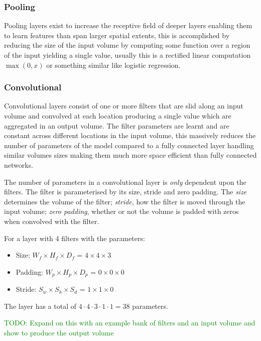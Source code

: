 \documentclass[A4paper,draft]{scrreprt}
\providecommand{\tightlist}{%
  \setlength{\itemsep}{0pt}\setlength{\parskip}{0pt}}
\begin{document}
\subsubsection{Pooling}\label{pooling}

Pooling layers exist to increase the receptive field of deeper layers
enabling them to learn features than span larger spatial extents, this
is accomplished by reducing the size of the input volume by computing
some function over a region of the input yielding a single value,
usually this is a rectified linear computation \(\max(0, x)\) or
something similar like logistic regression.

\subsubsection{Convolutional}\label{convolutional}

Convolutional layers consist of one or more filters that are slid along
an input volume and convolved at each location producing a single value
which are aggregated in an output volume. The filter parameters are
learnt and are constant across different locations in the input volume,
this massively reduces the number of parameters of the model compared to
a fully connected layer handling similar volumes sizes making them much
more space efficient than fully connected networks.

The number of parameters in a convolutional layer is \emph{only}
dependent upon the filters. The filter is parameterised by its size,
stride and zero padding. The \emph{size} determines the volume of the
filter; \emph{stride}, how the filter is moved through the input volume;
\emph{zero padding}, whether or not the volume is padded with zeros when
convolved with the filter.

For a layer with 4 filters with the parameters:

\begin{itemize}
\tightlist
\item
  Size: \(W_f \times H_f \times D_f\) = \(4 \times 4 \times 3\)
\item
  Padding: \(W_p \times H_p \times D_p\) = \(0 \times 0 \times 0\)
\item
  Stride: \(S_w \times S_h \times S_d\) = \(1 \times 1 \times 0\)
\end{itemize}

The layer has a total of \(4 \cdot 4 \cdot 3 \cdot 1 \cdot 1 = 38\)
parameters.

\textcolor{green}{TODO: Expand on this with an example bank of filters and an
input volume and show to produce the output volume}\newline
\end{document}
